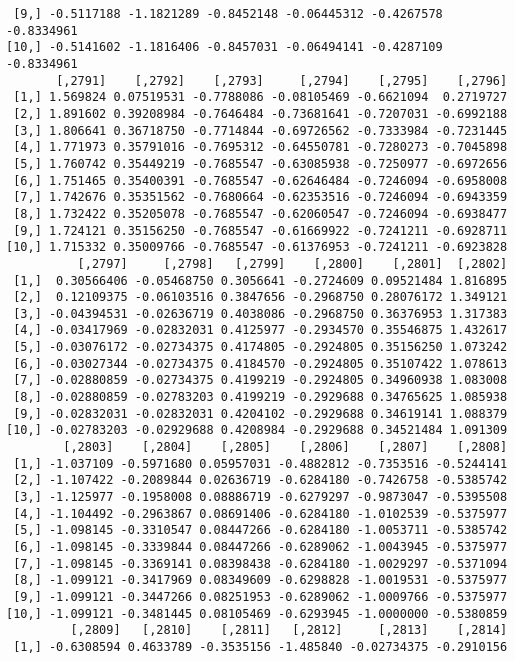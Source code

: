 \documentclass[
  letterpaper,
  DIV=11,
  numbers=noendperiod]{scrreprt}
\begin{document}
\begin{verbatim}
 [9,] -0.5117188 -1.1821289 -0.8452148 -0.06445312 -0.4267578 -0.8334961
[10,] -0.5141602 -1.1816406 -0.8457031 -0.06494141 -0.4287109 -0.8334961
       [,2791]    [,2792]    [,2793]     [,2794]    [,2795]    [,2796]
 [1,] 1.569824 0.07519531 -0.7788086 -0.08105469 -0.6621094  0.2719727
 [2,] 1.891602 0.39208984 -0.7646484 -0.73681641 -0.7207031 -0.6992188
 [3,] 1.806641 0.36718750 -0.7714844 -0.69726562 -0.7333984 -0.7231445
 [4,] 1.771973 0.35791016 -0.7695312 -0.64550781 -0.7280273 -0.7045898
 [5,] 1.760742 0.35449219 -0.7685547 -0.63085938 -0.7250977 -0.6972656
 [6,] 1.751465 0.35400391 -0.7685547 -0.62646484 -0.7246094 -0.6958008
 [7,] 1.742676 0.35351562 -0.7680664 -0.62353516 -0.7246094 -0.6943359
 [8,] 1.732422 0.35205078 -0.7685547 -0.62060547 -0.7246094 -0.6938477
 [9,] 1.724121 0.35156250 -0.7685547 -0.61669922 -0.7241211 -0.6928711
[10,] 1.715332 0.35009766 -0.7685547 -0.61376953 -0.7241211 -0.6923828
          [,2797]     [,2798]   [,2799]    [,2800]    [,2801]  [,2802]
 [1,]  0.30566406 -0.05468750 0.3056641 -0.2724609 0.09521484 1.816895
 [2,]  0.12109375 -0.06103516 0.3847656 -0.2968750 0.28076172 1.349121
 [3,] -0.04394531 -0.02636719 0.4038086 -0.2968750 0.36376953 1.317383
 [4,] -0.03417969 -0.02832031 0.4125977 -0.2934570 0.35546875 1.432617
 [5,] -0.03076172 -0.02734375 0.4174805 -0.2924805 0.35156250 1.073242
 [6,] -0.03027344 -0.02734375 0.4184570 -0.2924805 0.35107422 1.078613
 [7,] -0.02880859 -0.02734375 0.4199219 -0.2924805 0.34960938 1.083008
 [8,] -0.02880859 -0.02783203 0.4199219 -0.2929688 0.34765625 1.085938
 [9,] -0.02832031 -0.02832031 0.4204102 -0.2929688 0.34619141 1.088379
[10,] -0.02783203 -0.02929688 0.4208984 -0.2929688 0.34521484 1.091309
        [,2803]    [,2804]    [,2805]    [,2806]    [,2807]    [,2808]
 [1,] -1.037109 -0.5971680 0.05957031 -0.4882812 -0.7353516 -0.5244141
 [2,] -1.107422 -0.2089844 0.02636719 -0.6284180 -0.7426758 -0.5385742
 [3,] -1.125977 -0.1958008 0.08886719 -0.6279297 -0.9873047 -0.5395508
 [4,] -1.104492 -0.2963867 0.08691406 -0.6284180 -1.0102539 -0.5375977
 [5,] -1.098145 -0.3310547 0.08447266 -0.6284180 -1.0053711 -0.5385742
 [6,] -1.098145 -0.3339844 0.08447266 -0.6289062 -1.0043945 -0.5375977
 [7,] -1.098145 -0.3369141 0.08398438 -0.6284180 -1.0029297 -0.5371094
 [8,] -1.099121 -0.3417969 0.08349609 -0.6298828 -1.0019531 -0.5375977
 [9,] -1.099121 -0.3447266 0.08251953 -0.6289062 -1.0009766 -0.5375977
[10,] -1.099121 -0.3481445 0.08105469 -0.6293945 -1.0000000 -0.5380859
         [,2809]   [,2810]    [,2811]   [,2812]     [,2813]    [,2814]
 [1,] -0.6308594 0.4633789 -0.3535156 -1.485840 -0.02734375 -0.2910156

\end{verbatim}
\end{document}
